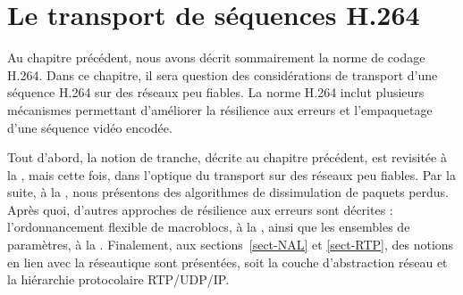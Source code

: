 \chapter{Le transport de séquences H.264}
\label{chap-h264transport}
Au chapitre précédent, nous avons décrit sommairement la norme de codage H.264.
Dans ce chapitre, il sera question des considérations de transport d'une
séquence H.264 sur des réseaux peu fiables. La norme H.264 inclut plusieurs
mécanismes permettant d'améliorer la résilience aux erreurs et l'empaquetage
d'une séquence vidéo encodée.

Tout d'abord, la notion de tranche, décrite au chapitre précédent, est revisitée
à la , mais cette fois, dans l'optique du transport sur des
réseaux peu fiables. Par la suite, à la , nous
présentons des algorithmes de dissimulation de paquets perdus. Après quoi,
d'autres approches de résilience aux erreurs sont décrites : l'ordonnancement
flexible de macroblocs, à la , ainsi que les ensembles de
paramètres, à la . Finalement, aux
sections~\ref{sect-NAL} et \ref{sect-RTP}, des notions en lien avec la
réseautique sont présentées, soit la couche d'abstraction réseau et la
hiérarchie protocolaire RTP/UDP/IP.


